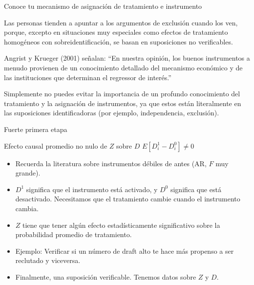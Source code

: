 \documentclass{beamer}
\begin{document}
\begin{frame}[allowframebreaks]{Conoce tu mecanismo de asignación de tratamiento e instrumento}

Las personas tienden a apuntar a los argumentos de exclusión cuando los ven, porque, excepto en situaciones muy especiales como efectos de tratamiento homogéneos con sobreidentificación, se basan en suposiciones no verificables.

\bigskip

Angrist y Krueger (2001) señalan: ``En nuestra opinión, los buenos instrumentos a menudo provienen de un conocimiento detallado del mecanismo económico y de las instituciones que determinan el regressor de interés.''

\bigskip

Simplemente no puedes evitar la importancia de un profundo conocimiento del tratamiento y la asignación de instrumentos, ya que estos están literalmente en las suposiciones identificadoras (por ejemplo, independencia, exclusión).

\end{frame}


\begin{frame}[allowframebreaks]{Fuerte primera etapa}
	
	\begin{block}{Efecto causal promedio no nulo de $Z$ sobre $D$}
	$E[D^1_{i} - D^0_{i}]\neq{0}$
	\end{block}
				
\begin{itemize}
\item Recuerda la literatura sobre instrumentos débiles de antes (AR, $F$ muy grande).
\item $D^1$ significa que el instrumento está activado, y $D^0$ significa que está desactivado. Necesitamos que el tratamiento cambie cuando el instrumento cambia.
\item $Z$ tiene que tener algún efecto estadísticamente significativo sobre la probabilidad promedio de tratamiento.
\item Ejemplo: Verificar si un número de draft alto te hace más propenso a ser reclutado y viceversa.
\item Finalmente, una suposición verificable. Tenemos datos sobre $Z$ y $D$.
\end{itemize}

\end{frame}			
\end{document}
